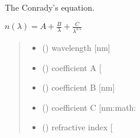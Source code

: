 \documentclass[letterpaper,10pt,english]{sphinxmanual}
\begin{document}

\begin{fulllineitems}
\label{\detokenize{05_refractive_index:skinoptics.refractive_index.n_Conrady}}
\pysigstartsignatures
{}
\pysigstopsignatures
\sphinxAtStartPar
The Conrady’s equation.

\sphinxAtStartPar
\(n(\lambda) = A + \frac{B}{\lambda} + \frac{C}{\lambda^{3.5}}\)
\begin{quote}\begin{description}
\begin{itemize}
\item {} 
\sphinxAtStartPar
{} () \textendash{} wavelength {[}nm{]}

\item {} 
\sphinxAtStartPar
{} () \textendash{} coefficient A {[}\sphinxhyphen{}{]}

\item {} 
\sphinxAtStartPar
{} () \textendash{} coefficient B {[}nm{]}

\item {} 
\sphinxAtStartPar
{} () \textendash{} coefficient C {[}nm:math:\sphinxtitleref{\textasciicircum{}\{3.5\}}{]}

\end{itemize}

\sphinxAtStartPar
\begin{itemize}
\item {} 
\sphinxAtStartPar
{} () \textendash{} refractive index {[}\sphinxhyphen{}{]}

\end{itemize}


\end{description}\end{quote}

\end{fulllineitems}
\end{document}
